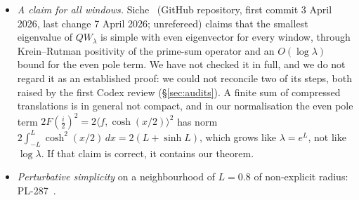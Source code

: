 \documentclass[11pt]{amsart}
\theoremstyle{definition}
\theoremstyle{remark}
\numberwithin{equation}{section}
\begin{document}
\begin{itemize}
\item \emph{A claim for all windows.} Siche~\cite{Siche} (GitHub repository, first commit 3 April 2026, last change 7 April 2026; unrefereed) claims that the smallest eigenvalue of $QW_\lambda$ is simple with even eigenvector for every window, through Krein--Rutman positivity of the prime-sum operator and an $O(\log\lambda)$ bound for the even pole term. We have not checked it in full, and we do not regard it as an established proof: we could not reconcile two of its steps, both raised by the first Codex review (\S\ref{sec:audits}). A finite sum of compressed translations is in general not compact, and in our normalisation the even pole term $2F(\tfrac i2)^2=2\langle f,\cosh(x/2)\rangle^2$ has norm $2\int_{-L}^L\cosh^2(x/2)\,dx=2(L+\sinh L)$, which grows like $\lambda=e^L$, not like $\log\lambda$. If that claim is correct, it contains our theorem.
\item \emph{Perturbative simplicity} on a neighbourhood of $L=0.8$ of non-explicit radius: PL-287~\cite{PL}.

\end{itemize}
\end{document}
